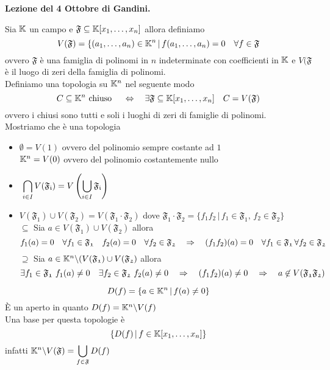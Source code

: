 


\textbf{Lezione del 4 Ottobre di Gandini.}
\begin{ex}\bianco
Sia $\mathbb{K}$ un campo  e $\mathfrak{F} \subseteq \mathbb{K}[x_1, \dots, x_n]$ allora definiamo $$V(\mathfrak{F}) = \{ (a_1, \dots, a_n ) \in \mathbb{K}^n \, \vert \, f(a_1,\dots, a_n)=0 \quad \forall f\in \mathfrak{F}$$
ovvero $\mathfrak{F}$ \`e una famiglia di polinomi in $n$ indeterminate con coefficienti in $\mathbb{K}$ e $V(\mathfrak{F}$ \`e il luogo di zeri della famiglia di polinomi.\\
Definiamo una topologia su $\mathbb{K}^n$ nel seguente modo
$$ C\subseteq \mathbb{K}^n \text{ chiuso } \quad \Leftrightarrow \quad \exists \mathfrak{F}\subseteq \mathbb{K}[x_1, \dots, x_n] \quad C=V(\mathfrak{F})$$
ovvero i chiusi sono tutti e soli i luoghi di zeri di famiglie di polinomi.\\
Mostriamo che \`e una topologia
\begin{itemize}
\item $\emptyset=V(1) $ ovvero del polinomio sempre costante ad $1$\\
$\mathbb{K}^n=V(0)$ ovvero del polinomio costantemente nullo
\item $\
\displaystyle \bigcap_{i\in I } V (\mathfrak{F_i})= V \left( \bigcup_{i \in I } \mathfrak{F_i} \right)$
\item $V(\mathfrak{F_1})\cup V(\mathfrak{F_2})=V (\mathfrak{F_1}\cdot \mathfrak{F_2}) $ dove $\mathfrak{F_1}\cdot \mathfrak{F_2}=\{ f_1f_2 \, \vert \, f_1\in \mathfrak{F_1} , \, f_2 \in \mathfrak{F_2} \}$\\
$\subseteq$ Sia $a\in V(\mathfrak{F_1})\cup V(\mathfrak{F_2})$ allora 
$$ f_1(a)=0 \quad \forall f_1 \in \mathfrak{F_1} \quad  f_2(a)=0 \quad \forall f_2 \in \mathfrak{F_2} \quad \Rightarrow \quad (f_1f_2)(a)= 0 \quad \forall f_1 \in \mathfrak{F_1} \,  \forall f_2 \in \mathfrak{F_2} $$
$\supseteq$ Sia $a\in \mathbb{K}^n \backslash ( V(\mathfrak{F_1}) \cup  V(\mathfrak{F_2})$ allora
$$\exists f_1 \in \mathfrak{F_1} \, \, f_1(a)\neq 0 \quad \exists f_2 \in \mathfrak{F_2} \, \, f_2(a)\neq 0 \quad  \Rightarrow \quad (f_1f_2)(a)\neq 0 \quad \Rightarrow \quad a \not \in V(\mathfrak{F_1}\mathfrak{F_2}) $$
\end{itemize}
\end{ex}
\begin{oss}
$$D(f) =\{ a \in \mathbb{K}^n \, \vert \, f(a)\neq 0 \}$$
\`E un aperto in quanto $D(f)=\mathbb{K}^n\backslash V(f)$\\
Una base per questa topologie \`e 
$$ \{ D(f) \, \vert \, f \in \mathbb{K}[x_1, \dots, x_n]\}$$
infatti $\displaystyle \mathbb{K}^n\backslash V(\mathfrak{F}) = \bigcup_{f\in \mathfrak{F}} D(f)$ 
\end{oss}
